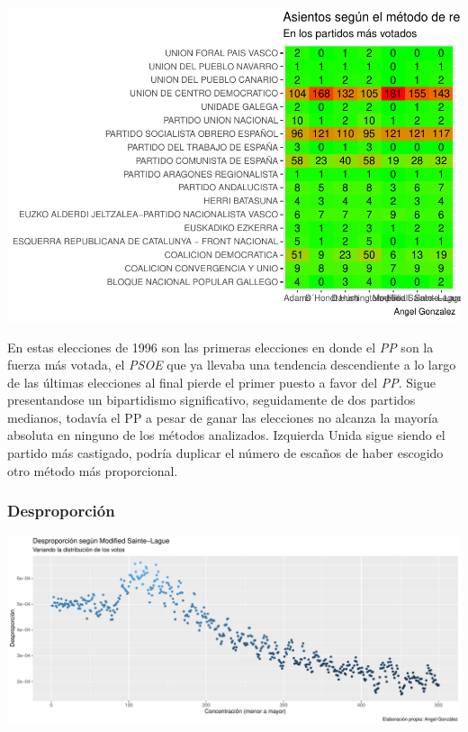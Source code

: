 \documentclass[12pt,a4paper,]{book}
\numberwithin{dummy}{section}
\theoremstyle{ocrenumbox}
\theoremstyle{blacknumex}
\theoremstyle{blacknumbox}
\theoremstyle{ocrenum}
\theoremstyle{ocrenum}
\begin{document}
\begin{center}\includegraphics[width=1\linewidth]{figurasR/unnamed-chunk-23-2} \end{center}

En estas elecciones de 1996 son las primeras elecciones en donde el
\emph{PP} son la fuerza más votada, el \emph{PSOE} que ya llevaba una
tendencia descendiente a lo largo de las últimas elecciones al final
pierde el primer puesto a favor del \emph{PP}. Sigue presentandose un
bipartidismo significativo, seguidamente de dos partidos medianos,
todavía el PP a pesar de ganar las elecciones no alcanza la mayoría
absoluta en ninguno de los métodos analizados. Izquierda Unida sigue
siendo el partido más castigado, podría duplicar el número de escaños de
haber escogido otro método más proporcional.

\hypertarget{desproporciuxf3n-6}{%
\subsubsection{Desproporción}\label{desproporciuxf3n-6}}

\begin{center}\includegraphics[width=1\linewidth]{figurasR/unnamed-chunk-24-1} \end{center}
\end{document}

